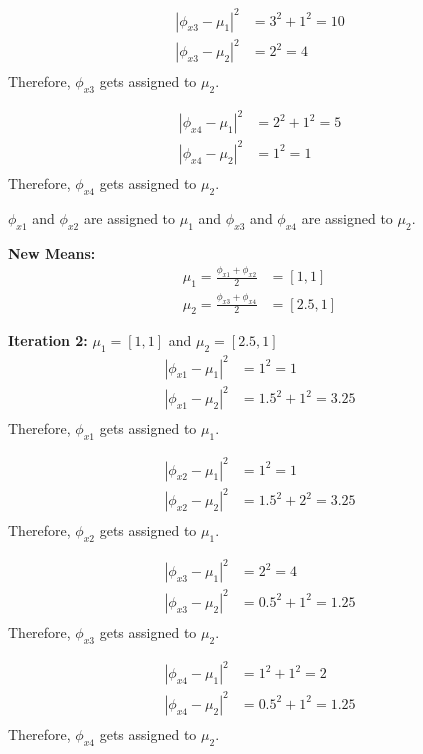 \documentclass[12pt]{article}
\begin{document}
\begin{enumerate}[label=(\alph*)]
\begin{enumerate}[label=(\arabic*)]
	\begin{align*}
	|\phi_{x3} - \mu_1|^2 &= 3^2 + 1^2 = 10 \\
	|\phi_{x3} - \mu_2|^2 &= 2^2 = 4 \\
	\end{align*}
	Therefore, $\phi_{x3}$ gets assigned to $\mu_2$.
	
	\begin{align*}
	|\phi_{x4} - \mu_1|^2 &= 2^2 + 1^2 = 5 \\
	|\phi_{x4} - \mu_2|^2 &= 1^2 = 1 \\
	\end{align*}
	Therefore, $\phi_{x4}$ gets assigned to $\mu_2$.
	
	$\phi_{x1}$ and $\phi_{x2}$ are assigned to $\mu_1$ and $\phi_{x3}$ and $\phi_{x4}$ are assigned to $\mu_2$.
	
	\textbf{New Means:}
	\begin{align*}
	\mu_1 = \frac{\phi_{x1} + \phi_{x2} }{2} &= [1, 1] \\
	\mu_2 = \frac{\phi_{x3} + \phi_{x4} }{2} &= [2.5, 1]
	\end{align*}
	
	\textbf{Iteration 2:}
	$\mu_1 = [1, 1]$ and $\mu_2 = [2.5, 1]$ \\

	\begin{align*}
	|\phi_{x1} - \mu_1|^2 &= 1^2 = 1 \\
	|\phi_{x1} - \mu_2|^2 &= 1.5^2 + 1^2 = 3.25 \\
	\end{align*}
	Therefore, $\phi_{x1}$ gets assigned to $\mu_1$.
	
	\begin{align*}
	|\phi_{x2} - \mu_1|^2 &= 1^2 = 1 \\
	|\phi_{x2} - \mu_2|^2 &= 1.5^2 + 2^2 = 3.25 \\
	\end{align*}
	Therefore, $\phi_{x2}$ gets assigned to $\mu_1$.
	
	\begin{align*}
	|\phi_{x3} - \mu_1|^2 &= 2^2 = 4 \\
	|\phi_{x3} - \mu_2|^2 &= 0.5^2 + 1^2 = 1.25 \\
	\end{align*}
	Therefore, $\phi_{x3}$ gets assigned to $\mu_2$.
	
	\begin{align*}
	|\phi_{x4} - \mu_1|^2 &= 1^2 + 1^2 = 2 \\
	|\phi_{x4} - \mu_2|^2 &= 0.5^2 + 1^2 = 1.25 \\
	\end{align*}
	Therefore, $\phi_{x4}$ gets assigned to $\mu_2$.
	

\end{enumerate}
\end{enumerate}
\end{document}
